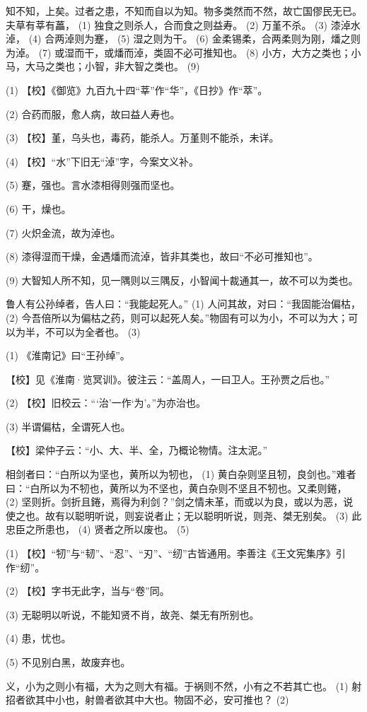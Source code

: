 \documentclass[12pt,UTF8]{ctexbook}
\begin{document}
知不知，上矣。过者之患，不知而自以为知。物多类然而不然，故亡国僇民无已。夫草有莘有藟， (1) 独食之则杀人，合而食之则益寿。 (2) 万堇不杀。 (3) 漆淖水淖， (4) 合两淖则为蹇， (5) 湿之则为干。 (6) 金柔锡柔，合两柔则为刚，燔之则为淖。 (7) 或湿而干，或燔而淖，类固不必可推知也。 (8) 小方，大方之类也；小马，大马之类也；小智，非大智之类也。 (9)

(1) 【校】《御览》九百九十四“莘”作“华”，《日抄》作“萃”。

(2) 合药而服，愈人病，故曰益人寿也。

(3) 【校】堇，乌头也，毒药，能杀人。万堇则不能杀，未详。

(4) 【校】“水”下旧无“淖”字，今案文义补。

(5) 蹇，强也。言水漆相得则强而坚也。

(6) 干，燥也。

(7) 火炽金流，故为淖也。

(8) 漆得湿而干燥，金遇燔而流淖，皆非其类也，故曰“不必可推知也”。

(9) 大智知人所不知，见一隅则以三隅反，小智闻十裁通其一，故不可以为类也。

鲁人有公孙绰者，告人曰：“我能起死人。” (1) 人问其故，对曰：“我固能治偏枯， (2) 今吾倍所以为偏枯之药，则可以起死人矣。”物固有可以为小，不可以为大；可以为半，不可以为全者也。 (3)

(1) 《淮南记》曰“王孙绰”。

【校】见《淮南·览冥训》。彼注云：“盖周人，一曰卫人。王孙贾之后也。”

(2) 【校】旧校云：“‘治’一作‘为’。”为亦治也。

(3) 半谓偏枯，全谓死人也。

【校】梁仲子云：“小、大、半、全，乃概论物情。注太泥。”

相剑者曰：“白所以为坚也，黄所以为牣也， (1) 黄白杂则坚且牣，良剑也。”难者曰：“白所以为不牣也，黄所以为不坚也，黄白杂则不坚且不牣也。又柔则錈， (2) 坚则折。剑折且錈，焉得为利剑？”剑之情未革，而或以为良，或以为恶，说使之也。故有以聪明听说，则妄说者止；无以聪明听说，则尧、桀无别矣。 (3) 此忠臣之所患也， (4) 贤者之所以废也。 (5)

(1) 【校】“牣”与“韧”、“忍”、“刃”、“纫”古皆通用。李善注《王文宪集序》引作“纫”。

(2) 【校】字书无此字，当与“卷”同。

(3) 无聪明以听说，不能知贤不肖，故尧、桀无有所别也。

(4) 患，忧也。

(5) 不见别白黑，故废弃也。

义，小为之则小有福，大为之则大有福。于祸则不然，小有之不若其亡也。 (1) 射招者欲其中小也，射兽者欲其中大也。物固不必，安可推也？ (2)
\end{document}
